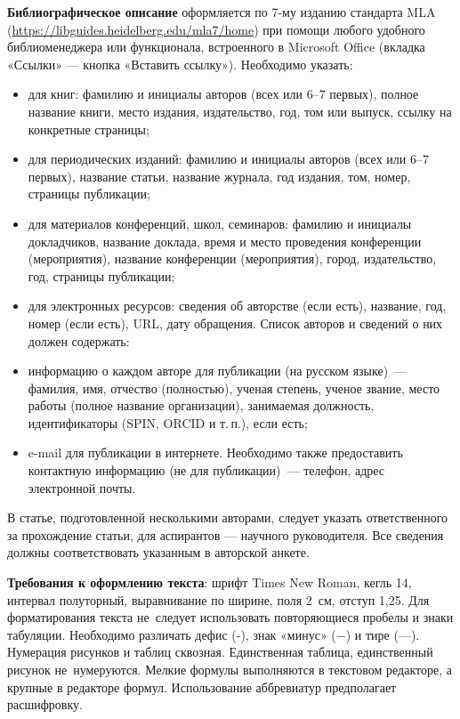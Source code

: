 \begin{multicols}{2}
\textbf{Библиографическое описание} оформляется по 7-му изданию стандарта MLA
(\url{https://libguides.heidelberg.edu/mla7/home})
при помощи любого удобного библиоменеджера или функционала, встроенного в Microsoft Office (вкладка «Ссылки» — кнопка «Вставить ссылку»). Необходимо указать:
\begin{itemize}
\item для книг: фамилию и инициалы авторов
(всех или 6--7 первых), полное название
книги, место издания, издательство, год,
том или выпуск, ссылку на конкретные
страницы;
\item  для периодических изданий: фамилию
и инициалы авторов (всех или 6--7 первых), название статьи, название журнала,
год издания, том, номер, страницы публикации;
\item  для материалов конференций, школ, семинаров: фамилию и инициалы докладчиков, название доклада, время и место
проведения конференции (мероприятия), название конференции (мероприятия), город, издательство, год, страницы
публикации;
\item  для электронных ресурсов: сведения об
авторстве (если есть), название, год,
номер (если есть), URL, дату обращения.
Список авторов и сведений о них должен
содержать:
\item  информацию о каждом авторе для публикации (на русском языке) — фамилия,
имя, отчество (полностью), ученая степень, ученое звание, место работы (полное название организации), занимаемая должность, идентификаторы (SPIN,
ORCID и т.\,п.), если есть;
\item  e-mail для публикации в интернете.
Необходимо также предоставить контактную информацию (не для публикации) — 
телефон, адрес электронной почты.
\end{itemize}

В статье, подготовленной несколькими
авторами, следует указать ответственного
за прохождение статьи, для аспирантов —
научного руководителя. Все сведения
должны соответствовать указанным
в авторской анкете.

\textbf{Требования к оформлению текста}: шрифт
Times New Roman, кегль 14, интервал
полуторный, выравнивание по ширине,
поля 2 см, отступ 1,25. Для форматирования
текста не~следует использовать повторяющиеся пробелы и знаки табуляции. Необходимо различать дефис (-), знак «минус» (−)
и тире (—). Нумерация рисунков и таблиц
сквозная. Единственная таблица, единственный рисунок не~нумеруются. Мелкие
формулы выполняются в текстовом редакторе, а крупные в редакторе формул.
Использование аббревиатур предполагает
расшифровку.


\end{multicols}
